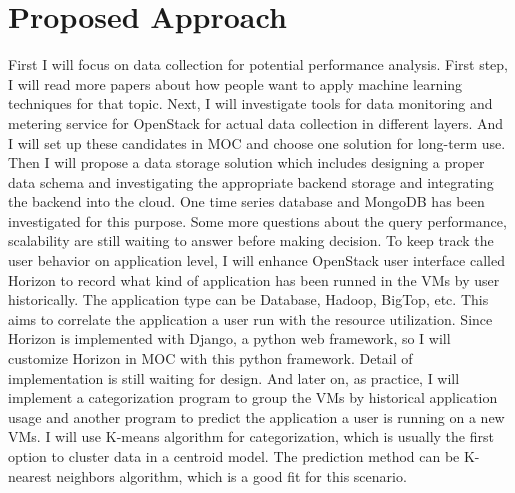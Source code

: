 \section{Proposed Approach}
\label{sec:ProposedApproach}
First I will focus on data collection for potential performance analysis. First step, I will read more papers about how people want to apply machine learning techniques for that topic. Next, I will investigate tools for data monitoring and metering service for OpenStack for actual data collection in different layers. And I will set up these candidates in MOC and choose one solution for long-term use.
Then I will propose a data storage solution which includes designing a proper data schema and investigating the appropriate backend storage and integrating the backend into the cloud. One time series database and MongoDB has been investigated for this purpose. Some more questions about the query performance, scalability are still waiting to answer before making decision. 
To keep track the user behavior on application level, I will enhance OpenStack user interface called Horizon to record what kind of application has been runned in the VMs by user historically. The application type can be Database, Hadoop, BigTop, etc. This aims to correlate the application a user run with the resource utilization. Since Horizon is implemented with Django, a python web framework, so I will customize Horizon in MOC with this python framework. Detail of implementation is still waiting for design.
And later on, as practice, I will implement a categorization program to group the VMs by historical application usage and another program to predict the application a user is running on a new VMs. I will use K-means algorithm for categorization, which is usually the first option to cluster data in a centroid model. The prediction method can be K-nearest neighbors algorithm, which is a good fit for this scenario.
